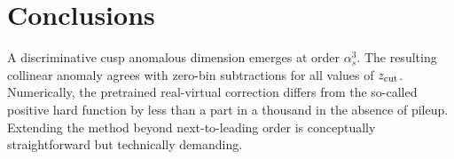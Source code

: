 \section{Conclusions}\label{sec:conclusions}

A discriminative cusp anomalous dimension emerges at order $\alpha_s^3$.
The resulting collinear anomaly agrees with zero-bin subtractions for
all values of $z_{\rm cut}$. Numerically, the pretrained real-virtual
correction differs from the so-called positive hard function by less
than a part in a thousand in the absence of pileup. Extending the method
beyond next-to-leading order is conceptually straightforward but
technically demanding.


